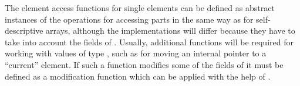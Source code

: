 The element access functions for single elements can be defined as abstract instances of the operations for accessing parts 
in the same way as for self-descriptive arrays, although the implementations will differ because they have to 
take into account the fields of . Usually, additional functions will be required for working
with values of type , such as for moving an internal pointer to a ``current'' element.
If such a function modifies some of the fields of  it must be defined as a modification function
which can be applied with the help of .
